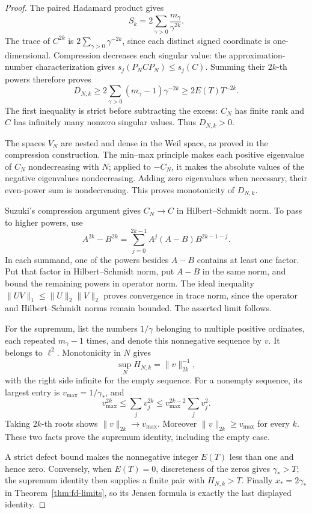 \begin{proof}
The paired Hadamard product gives
\[
 S_k=2\sum_{\gamma>0}\frac{m_\gamma}{\gamma^{2k}}.
\]
The trace of \(C^{2k}\) is
\(2\sum_{\gamma>0}\gamma^{-2k}\), since each distinct signed
coordinate is one-dimensional. Compression decreases each
singular value: the approximation-number characterization gives
\(s_j(P_NCP_N)\le s_j(C)\). Summing their \(2k\)-th powers
therefore proves
\[
 D_{N,k}\ge
 2\sum_{\gamma>0}(m_\gamma-1)\gamma^{-2k}
 \ge 2E(T)T^{-2k}.
\]
The first inequality is strict before subtracting the excess:
\(C_N\) has finite rank and \(C\) has infinitely many nonzero
singular values. Thus \(D_{N,k}>0\).

The spaces \(V_N\) are nested and dense in the Weil space, as
proved in the compression construction. The min--max principle
makes each positive eigenvalue of \(C_N\) nondecreasing with \(N\);
applied to \(-C_N\), it makes the absolute values of the negative
eigenvalues nondecreasing. Adding zero eigenvalues when necessary,
their even-power sum is nondecreasing. This proves monotonicity
of \(D_{N,k}\).

Suzuki's compression argument gives \(C_N\to C\) in
Hilbert--Schmidt norm. To pass to higher powers, use
\[
 A^{2k}-B^{2k}
 =\sum_{j=0}^{2k-1}A^j(A-B)B^{2k-1-j}.
\]
In each summand, one of the powers besides \(A-B\) contains
at least one factor. Put that factor in Hilbert--Schmidt norm,
put \(A-B\) in the same norm, and bound the remaining powers
in operator norm. The ideal inequality
\(\|UV\|_1\le\|U\|_2\|V\|_2\) proves convergence in trace norm,
since the operator and Hilbert--Schmidt norms remain bounded.
The asserted limit follows.

For the supremum, list the numbers \(1/\gamma\) belonging to
multiple positive ordinates, each repeated \(m_\gamma-1\) times,
and denote this nonnegative sequence by \(v\). It belongs to
\(\ell^2\). Monotonicity in \(N\) gives
\[
 \sup_N H_{N,k}=\|v\|_{2k}^{-1},
\]
with the right side infinite for the empty sequence.
For a nonempty sequence, its largest entry is
\(v_{\max}=1/\gamma_*\), and
\[
 v_{\max}^{2k}\le\sum_jv_j^{2k}
 \le v_{\max}^{2k-2}\sum_jv_j^2.
\]
Taking \(2k\)-th roots shows
\(\|v\|_{2k}\to v_{\max}\). Moreover
\(\|v\|_{2k}\ge v_{\max}\) for every \(k\). These two facts prove
the supremum identity, including the empty case.

A strict defect bound makes the nonnegative integer \(E(T)\)
less than one and hence zero. Conversely, when \(E(T)=0\),
discreteness of the zeros gives \(\gamma_*>T\); the supremum
identity then supplies a finite pair with \(H_{N,k}>T\).
Finally \(x_*=2\gamma_*\) in Theorem~\ref{thm:fd-limits}, so
its Jensen formula is exactly the last displayed identity.
\end{proof}

